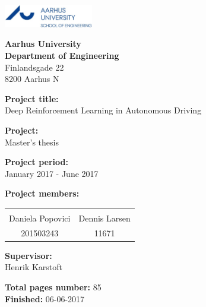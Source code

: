 \newpage
\mbox{}
\thispagestyle{empty}
\newpage


{}

\begin{minipage}[t]{0.48\textwidth}
	\vspace*{14pt}			%
	\vspace{1.2cm}
	\includegraphics[height=1cm]{Figures/au_ingenioerhoejskolen_en_logo.jpg} 
\end{minipage}
\hfill

\vspace*{1cm}

\begin{minipage}[t]{1\textwidth}
	
	{\small 
		\flushleft
		\textbf{Aarhus University}\\
		\textbf{Department of Engineering}  \\
		Finlandsgade 22 \\
		8200 Aarhus N \\
	}
	
	\vspace*{1cm}
	
	\textbf{Project title:} \\[5pt]\bigskip\hspace{2ex}
	Deep Reinforcement Learning in Autonomous Driving
	
	\textbf{Project:} \\[5pt]\bigskip\hspace{2ex}
	Master's thesis
	
	\textbf{Project period:} \\[5pt]\bigskip\hspace{2ex}
	January 2017 - June 2017
	
	\textbf{Project members:} \\[5pt]\hspace*{2ex}
	\begin{table}[H]
		\begin{tabular}{c c}
			\underline{\phantom{mmmmmmmmmmmmmmmm}} & \underline{\phantom{mmmmmmmmmmmmmmmm}}  
			\\
			Daniela Popovici		& Dennis Larsen	
			\\
			201503243				& 11671												
		\end{tabular}
	\end{table}
	
	\textbf{Supervisor:} \\[5pt]\hspace*{2ex}
	Henrik Karstoft \\\hspace*{2ex}
	
	\textbf{Total pages number:} 85 \\
	\textbf{Finished:} 06-06-2017
	\hfill
	\vfill
\end{minipage}

